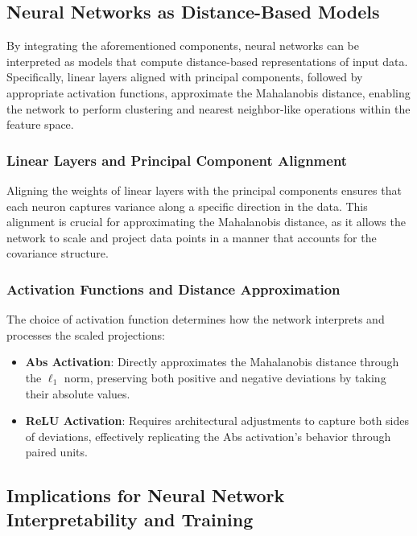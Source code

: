 \subsection{Neural Networks as Distance-Based Models}

By integrating the aforementioned components, neural networks can be interpreted as models that compute distance-based representations of input data. Specifically, linear layers aligned with principal components, followed by appropriate activation functions, approximate the Mahalanobis distance, enabling the network to perform clustering and nearest neighbor-like operations within the feature space.

\subsubsection{Linear Layers and Principal Component Alignment}

Aligning the weights of linear layers with the principal components ensures that each neuron captures variance along a specific direction in the data. This alignment is crucial for approximating the Mahalanobis distance, as it allows the network to scale and project data points in a manner that accounts for the covariance structure.

\subsubsection{Activation Functions and Distance Approximation}

The choice of activation function determines how the network interprets and processes the scaled projections:

\begin{itemize}
    \item \textbf{Abs Activation}: Directly approximates the Mahalanobis distance through the $\ell_1$ norm, preserving both positive and negative deviations by taking their absolute values.
    
    \item \textbf{ReLU Activation}: Requires architectural adjustments to capture both sides of deviations, effectively replicating the Abs activation's behavior through paired units.
\end{itemize}

\subsection{Implications for Neural Network Interpretability and Training}

